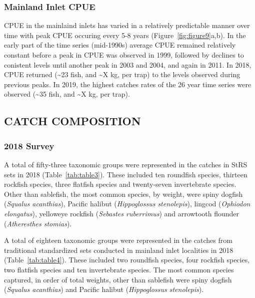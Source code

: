 \documentclass[12pt]{article}\usepackage[]{graphicx}\usepackage[]{color}
\begin{document}
\hypertarget{mainland-inlet-cpue}{%
\subsubsection{Mainland Inlet CPUE}\label{mainland-inlet-cpue}}

CPUE in the mainlaind inlets has varied in a relatively predictable manner over time with peak CPUE occuring every 5-8 years (Figure~\ref{fig:figure9}a,b). In the early part of the time series (mid-1990s) average CPUE remained relatively constant before a peak in CPUE was observed in 1999, followed by declines to conistent levels until another peak in 2003 and 2004, and again in 2011. In 2018, CPUE returned (\textasciitilde23 fish, and \textasciitilde X kg, per trap) to the levels observed during previous peaks. In 2019, the highest catches rates of the 26 year time series were observed (\textasciitilde35 fish, and \textasciitilde X kg, per trap).

\hypertarget{catch-composition}{%
\subsection{CATCH COMPOSITION}\label{catch-composition}}

\hypertarget{survey-2}{%
\subsubsection{2018 Survey}\label{survey-2}}

A total of fifty-three taxonomic groups were represented in the catches in StRS sets in 2018 (Table~\ref{tab:table3}). These included ten roundfish species, thirteen rockfish species, three flatfish species and twenty-seven invertebrate species. Other than sablefish, the most common species, by weight, were spiny dogfish (\emph{Squalus acanthias}), Pacific halibut (\emph{Hippoglossus stenolepis}), lingcod (\emph{Ophiodon elongatus}), yelloweye rockfish (\emph{Sebastes ruberrimus}) and arrowtooth flounder (\emph{Atheresthes stomias}).

A total of eighteen taxonomic groups were represented in the catches from traditional standardized sets conducted in mainland inlet localities in 2018 (Table~\ref{tab:table4}). These included two roundfish species, four rockfish species, two flatfish species and ten invertebrate species. The most common species captured, in order of total weights, other than sablefish were spiny dogfish (\emph{Squalus acanthias}) and Pacific halibut (\emph{Hippoglossus stenolepis}).
\end{document}
